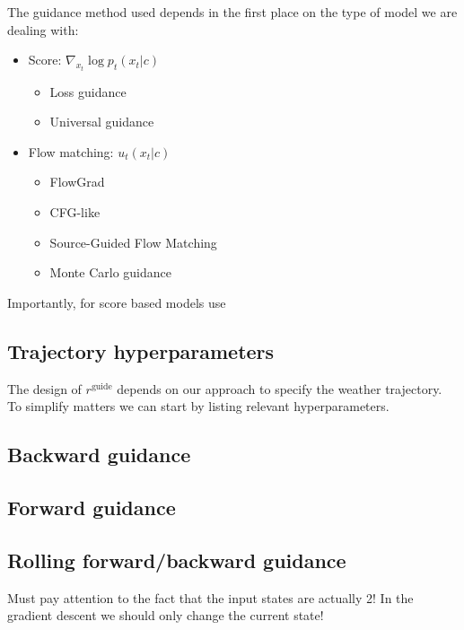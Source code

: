 \documentclass[a4paper,12pt]{article}
\begin{document}
The guidance method used depends in the first place on the type of model we are dealing with:
\begin{itemize}
    \item Score: $\nabla_{x_t} \log p_t(x_t|c)$
        \begin{itemize}
            \item Loss guidance
            \item Universal guidance
        \end{itemize}
    \item Flow matching: $u_t(x_t|c)$
        \begin{itemize}
            \item FlowGrad
            \item CFG-like 
            \item Source-Guided Flow Matching
            \item Monte Carlo guidance
        \end{itemize}
\end{itemize}

Importantly, for score based models use 

\subsection{Trajectory hyperparameters}
The design of $r^\text{guide}$ depends on our approach to specify the weather trajectory.
To simplify matters we can start by listing relevant hyperparameters. 

\subsection{Backward guidance}



\subsection{Forward guidance}

\subsection{Rolling forward/backward guidance}
Must pay attention to the fact that the input states are actually 2! In the gradient descent we should only change the current state!
\end{document}
